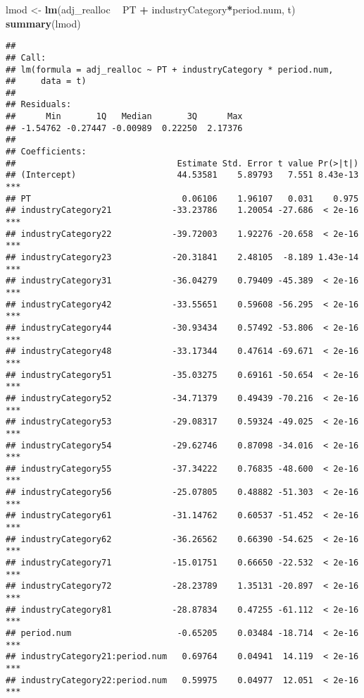 \documentclass[
]{article}
\newenvironment{Shaded}{\begin{snugshade}}{\end{snugshade}}
\newcommand{\KeywordTok}[1]{\textcolor[rgb]{0.13,0.29,0.53}{\textbf{#1}}}
\newcommand{\NormalTok}[1]{#1}
\newcommand{\OperatorTok}[1]{\textcolor[rgb]{0.81,0.36,0.00}{\textbf{#1}}}
\newcommand{\StringTok}[1]{\textcolor[rgb]{0.31,0.60,0.02}{#1}}
\begin{document}
\begin{Shaded}
\begin{Highlighting}[]
\NormalTok{lmod <-}\StringTok{ }\KeywordTok{lm}\NormalTok{(adj_realloc }\OperatorTok{~}\StringTok{  }\NormalTok{PT }\OperatorTok{+}\StringTok{ }\NormalTok{industryCategory}\OperatorTok{*}\NormalTok{period.num, t)}
\KeywordTok{summary}\NormalTok{(lmod)}
\end{Highlighting}
\end{Shaded}

\begin{verbatim}
## 
## Call:
## lm(formula = adj_realloc ~ PT + industryCategory * period.num, 
##     data = t)
## 
## Residuals:
##      Min       1Q   Median       3Q      Max 
## -1.54762 -0.27447 -0.00989  0.22250  2.17376 
## 
## Coefficients:
##                                Estimate Std. Error t value Pr(>|t|)    
## (Intercept)                    44.53581    5.89793   7.551 8.43e-13 ***
## PT                              0.06106    1.96107   0.031    0.975    
## industryCategory21            -33.23786    1.20054 -27.686  < 2e-16 ***
## industryCategory22            -39.72003    1.92276 -20.658  < 2e-16 ***
## industryCategory23            -20.31841    2.48105  -8.189 1.43e-14 ***
## industryCategory31            -36.04279    0.79409 -45.389  < 2e-16 ***
## industryCategory42            -33.55651    0.59608 -56.295  < 2e-16 ***
## industryCategory44            -30.93434    0.57492 -53.806  < 2e-16 ***
## industryCategory48            -33.17344    0.47614 -69.671  < 2e-16 ***
## industryCategory51            -35.03275    0.69161 -50.654  < 2e-16 ***
## industryCategory52            -34.71379    0.49439 -70.216  < 2e-16 ***
## industryCategory53            -29.08317    0.59324 -49.025  < 2e-16 ***
## industryCategory54            -29.62746    0.87098 -34.016  < 2e-16 ***
## industryCategory55            -37.34222    0.76835 -48.600  < 2e-16 ***
## industryCategory56            -25.07805    0.48882 -51.303  < 2e-16 ***
## industryCategory61            -31.14762    0.60537 -51.452  < 2e-16 ***
## industryCategory62            -36.26562    0.66390 -54.625  < 2e-16 ***
## industryCategory71            -15.01751    0.66650 -22.532  < 2e-16 ***
## industryCategory72            -28.23789    1.35131 -20.897  < 2e-16 ***
## industryCategory81            -28.87834    0.47255 -61.112  < 2e-16 ***
## period.num                     -0.65205    0.03484 -18.714  < 2e-16 ***
## industryCategory21:period.num   0.69764    0.04941  14.119  < 2e-16 ***
## industryCategory22:period.num   0.59975    0.04977  12.051  < 2e-16 ***

\end{verbatim}
\end{document}

